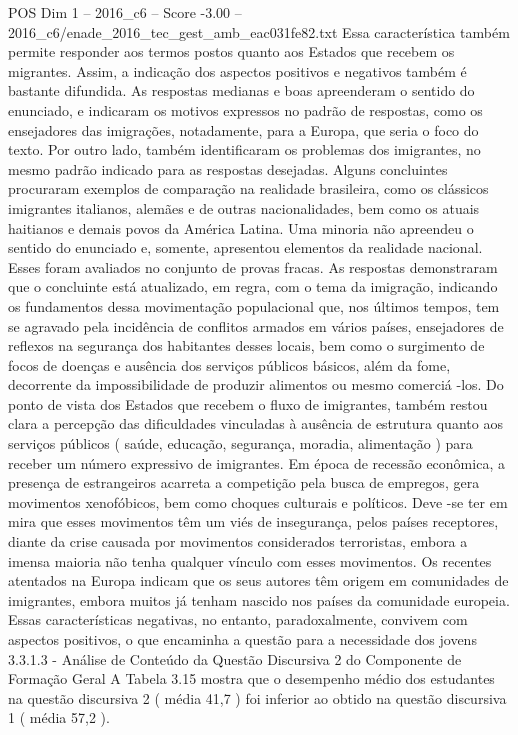 \begin{textsample}{POS Dim 1 – 2016\_c6 – Score -3.00 – 2016\_c6/enade\_2016\_tec\_gest\_amb\_eac031fe82.txt}
Essa característica também permite responder aos termos postos quanto aos Estados que recebem os migrantes.
Assim, a indicação dos aspectos positivos e negativos também é bastante difundida.
As respostas medianas e boas apreenderam o sentido do enunciado, e indicaram os motivos expressos no padrão de respostas, como os ensejadores das imigrações, notadamente, para a Europa, que seria o foco do texto.
Por outro lado, também identificaram os problemas dos imigrantes, no mesmo padrão indicado para as respostas desejadas.
Alguns concluintes procuraram exemplos de comparação na realidade brasileira, como os clássicos imigrantes italianos, alemães e de outras nacionalidades, bem como os atuais haitianos e demais povos da América Latina.
Uma minoria não apreendeu o sentido do enunciado e, somente, apresentou elementos da realidade nacional.
Esses foram avaliados no conjunto de provas fracas.
As respostas demonstraram que o concluinte está atualizado, em regra, com o tema da imigração, indicando os fundamentos dessa movimentação populacional que, nos últimos tempos, tem se agravado pela incidência de conflitos armados em vários países, ensejadores de reflexos na segurança dos habitantes desses locais, bem como o surgimento de focos de doenças e ausência dos serviços públicos básicos, além da fome, decorrente da impossibilidade de produzir alimentos ou mesmo comerciá -los.
Do ponto de vista dos Estados que recebem o fluxo de imigrantes, também restou clara a percepção das dificuldades vinculadas à ausência de estrutura quanto aos serviços públicos ( saúde, educação, segurança, moradia, alimentação ) para receber um número expressivo de imigrantes.
Em época de recessão econômica, a presença de estrangeiros acarreta a competição pela busca de empregos, gera movimentos xenofóbicos, bem como choques culturais e políticos.
Deve -se ter em mira que esses movimentos têm um viés de insegurança, pelos países receptores, diante da crise causada por movimentos considerados terroristas, embora a imensa maioria não tenha qualquer vínculo com esses movimentos.
Os recentes atentados na Europa indicam que os seus autores têm origem em comunidades de imigrantes, embora muitos já tenham nascido nos países da comunidade europeia.
Essas características negativas, no entanto, paradoxalmente, convivem com aspectos positivos, o que encaminha a questão para a necessidade dos jovens 3.3.1.3 - Análise de Conteúdo da Questão Discursiva 2 do Componente de Formação Geral A Tabela 3.15 mostra que o desempenho médio dos estudantes na questão discursiva 2 ( média 41,7 ) foi inferior ao obtido na questão discursiva 1 ( média 57,2 ).

\end{textsample}
